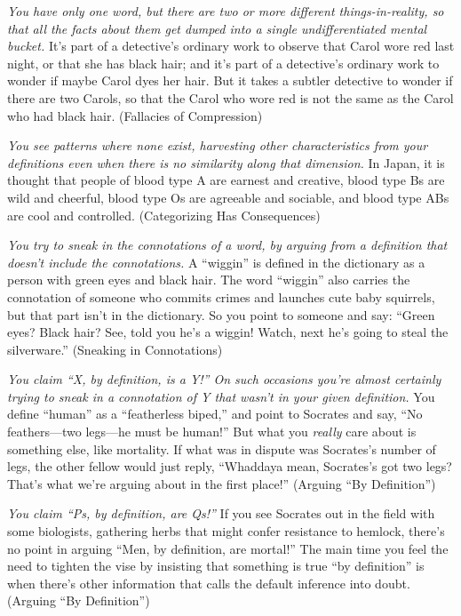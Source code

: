 {
 \textit{You have only one word, but there are two or more
different things-in-reality, so that all the facts about them get
dumped into a single undifferentiated mental bucket.}
It's part of a detective's ordinary
work to observe that Carol wore red last night, or that she has black
hair; and it's part of a detective's
ordinary work to wonder if maybe Carol dyes her hair. But it takes a
subtler detective to wonder if there are two Carols, so that the Carol
who wore red is not the same as the Carol who had black hair.
(Fallacies of Compression)}

{
 \textit{You see patterns where none exist, harvesting other
characteristics from your }\textit{definitions even when there is no
similarity along that dimension.} In Japan, it is thought that people
of blood type A are earnest and creative, blood type Bs are wild and
cheerful, blood type Os are agreeable and sociable, and blood type ABs
are cool and controlled. (Categorizing Has Consequences)}

{
 \textit{You try to sneak in the connotations of a word, by arguing
from a definition that doesn't include the
connotations.} A ``wiggin'' is
defined in the dictionary as a person with green eyes and black hair.
The word ``wiggin'' also carries the
connotation of someone who commits crimes and launches cute baby
squirrels, but that part isn't in the dictionary. So
you point to someone and say: ``Green eyes? Black
hair? See, told you he's a wiggin! Watch, next
he's going to steal the silverware.''
(Sneaking in Connotations)}

{
 \textit{You claim ``X, by definition, is a
Y!'' On such occasions you're almost
certainly trying to sneak in a connotation of Y that
wasn't in your given definition.} You define
``human'' as a
``featherless biped,'' and point to
Socrates and say, ``No feathers---two legs---he must
be human!'' But what you \textit{really} care about
is something else, like mortality. If what was in dispute was
Socrates's number of legs, the other fellow would just
reply, ``Whaddaya mean, Socrates's got
two legs? That's what we're arguing
about in the first place!'' (Arguing
``By Definition'')}

{
 \textit{You claim ``Ps, by definition, are
Qs!''} If you see Socrates out in the field with some
biologists, gathering herbs that might confer resistance to hemlock,
there's no point in arguing ``Men, by
definition, are mortal!'' The main time you feel the
need to tighten the vise by insisting that something is true
``by definition'' is when
there's other information that calls the default
inference into doubt. (Arguing ``By
Definition'')}

